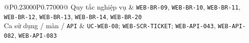 \begin{longtable}{@{}P{0.23000\SRSWidth}P{0.77000\SRSWidth}@{}}
Quy tắc nghiệp vụ & \texttt{WEB-\allowbreak{}BR-\allowbreak{}09}, \texttt{WEB-\allowbreak{}BR-\allowbreak{}10}, \texttt{WEB-\allowbreak{}BR-\allowbreak{}11}, \texttt{WEB-\allowbreak{}BR-\allowbreak{}12}, \texttt{WEB-\allowbreak{}BR-\allowbreak{}13}, \texttt{WEB-\allowbreak{}BR-\allowbreak{}14}, \texttt{WEB-\allowbreak{}BR-\allowbreak{}20} \\[3pt]
Ca sử dụng /\allowbreak{} màn /\allowbreak{} \texttt{API} & \texttt{UC-\allowbreak{}WEB-\allowbreak{}08}; \texttt{WEB-\allowbreak{}SCR-\allowbreak{}TICKET}; \texttt{WEB-\allowbreak{}API-\allowbreak{}043}, \texttt{WEB-\allowbreak{}API-\allowbreak{}082}, \texttt{WEB-\allowbreak{}API-\allowbreak{}083} \\[3pt]
\end{longtable}
\endgroup

